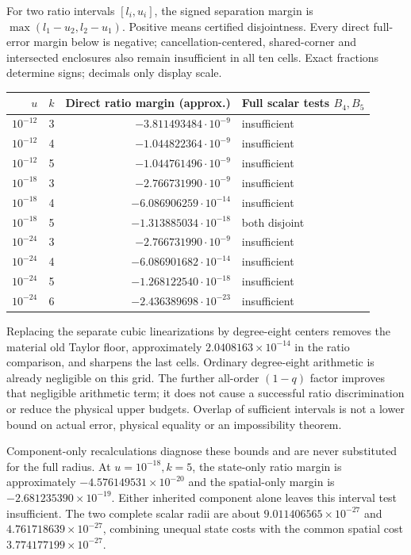 For two ratio intervals $[l_i,u_i]$, the signed separation margin is $\max(l_1-u_2,l_2-u_1)$. Positive means certified disjointness. Every direct full-error margin below is negative; cancellation-centered, shared-corner and intersected enclosures also remain insufficient in all ten cells. Exact fractions determine signs; decimals only display scale.
\begin{center}\small
\begin{tabular}{@{}rrrl@{}}\toprule
$u$ & $k$ & Direct ratio margin (approx.) & Full scalar tests $B_4,B_5$\\\midrule
$10^{-12}$&3&$-3.811493484\cdot10^{-9}$&insufficient\\
$10^{-12}$&4&$-1.044822364\cdot10^{-9}$&insufficient\\
$10^{-12}$&5&$-1.044761496\cdot10^{-9}$&insufficient\\
$10^{-18}$&3&$-2.766731990\cdot10^{-9}$&insufficient\\
$10^{-18}$&4&$-6.086906259\cdot10^{-14}$&insufficient\\
$10^{-18}$&5&$-1.313885034\cdot10^{-18}$&both disjoint\\
$10^{-24}$&3&$-2.766731990\cdot10^{-9}$&insufficient\\
$10^{-24}$&4&$-6.086901682\cdot10^{-14}$&insufficient\\
$10^{-24}$&5&$-1.268122540\cdot10^{-18}$&insufficient\\
$10^{-24}$&6&$-2.436389698\cdot10^{-23}$&insufficient\\\bottomrule
\end{tabular}
\end{center}
Replacing the separate cubic linearizations by degree-eight centers removes the material old Taylor floor, approximately $2.0408163\times10^{-14}$ in the ratio comparison, and sharpens the last cells. Ordinary degree-eight arithmetic is already negligible on this grid. The further all-order $(1-q)$ factor improves that negligible arithmetic term; it does not cause a successful ratio discrimination or reduce the physical upper budgets. Overlap of sufficient intervals is not a lower bound on actual error, physical equality or an impossibility theorem.

Component-only recalculations diagnose these bounds and are never substituted for the full radius. At $u=10^{-18},k=5$, the state-only ratio margin is approximately $-4.576149531\times10^{-20}$ and the spatial-only margin is $-2.681235390\times10^{-19}$. Either inherited component alone leaves this interval test insufficient. The two complete scalar radii are about $9.011406565\times10^{-27}$ and $4.761718639\times10^{-27}$, combining unequal state costs with the common spatial cost $3.774177199\times10^{-27}$.

